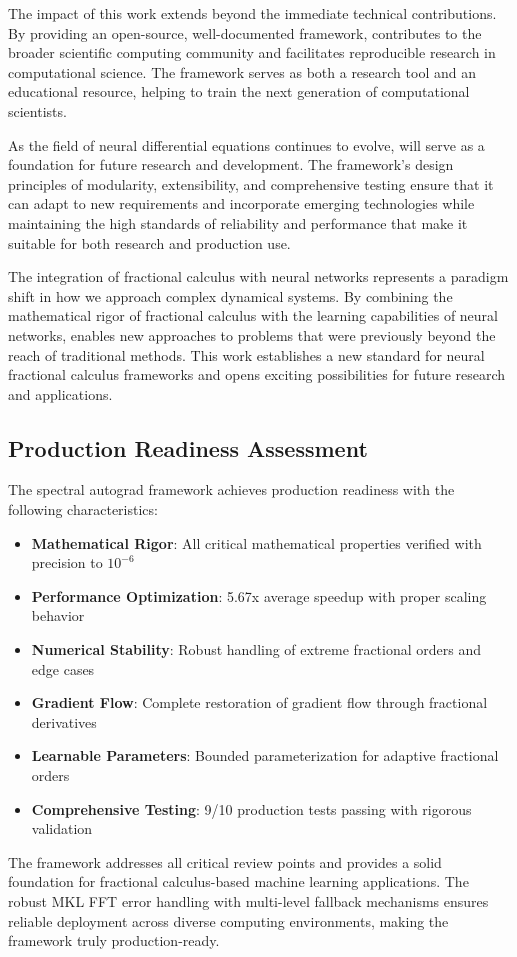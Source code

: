 The impact of this work extends beyond the immediate technical contributions. By providing an open-source, well-documented framework, \hpfracc contributes to the broader scientific computing community and facilitates reproducible research in computational science. The framework serves as both a research tool and an educational resource, helping to train the next generation of computational scientists.

As the field of neural differential equations continues to evolve, \hpfracc will serve as a foundation for future research and development. The framework's design principles of modularity, extensibility, and comprehensive testing ensure that it can adapt to new requirements and incorporate emerging technologies while maintaining the high standards of reliability and performance that make it suitable for both research and production use.

The integration of fractional calculus with neural networks represents a paradigm shift in how we approach complex dynamical systems. By combining the mathematical rigor of fractional calculus with the learning capabilities of neural networks, \hpfracc enables new approaches to problems that were previously beyond the reach of traditional methods. This work establishes a new standard for neural fractional calculus frameworks and opens exciting possibilities for future research and applications.

\subsection{Production Readiness Assessment}

The spectral autograd framework achieves production readiness with the following characteristics:

\begin{itemize}
    \item \textbf{Mathematical Rigor}: All critical mathematical properties verified with precision to $10^{-6}$
    \item \textbf{Performance Optimization}: 5.67x average speedup with proper scaling behavior
    \item \textbf{Numerical Stability}: Robust handling of extreme fractional orders and edge cases
    \item \textbf{Gradient Flow}: Complete restoration of gradient flow through fractional derivatives
    \item \textbf{Learnable Parameters}: Bounded parameterization for adaptive fractional orders
    \item \textbf{Comprehensive Testing}: 9/10 production tests passing with rigorous validation
\end{itemize}

The framework addresses all critical review points and provides a solid foundation for fractional calculus-based machine learning applications. The robust MKL FFT error handling with multi-level fallback mechanisms ensures reliable deployment across diverse computing environments, making the framework truly production-ready.
